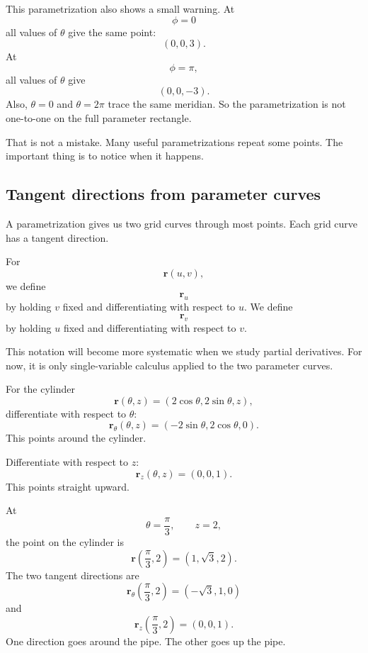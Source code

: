 This parametrization also shows a small warning.  At
\[
    \phi=0
\]
all values of \(\theta\) give the same point:
\[
    (0,0,3).
\]
At
\[
    \phi=\pi,
\]
all values of \(\theta\) give
\[
    (0,0,-3).
\]
Also, \(\theta=0\) and \(\theta=2\pi\) trace the same meridian.  So the parametrization
is not one-to-one on the full parameter rectangle.

That is not a mistake.  Many useful parametrizations repeat some points.  The important
thing is to notice when it happens.

\subsection{Tangent directions from parameter curves}

A parametrization gives us two grid curves through most points.  Each grid curve has
a tangent direction.

For
\[
    \mathbf r(u,v),
\]
we define
\[
    \mathbf r_u
\]
by holding \(v\) fixed and differentiating with respect to \(u\).  We define
\[
    \mathbf r_v
\]
by holding \(u\) fixed and differentiating with respect to \(v\).

This notation will become more systematic when we study partial derivatives.  For now,
it is only single-variable calculus applied to the two parameter curves.

\begin{example}
For the cylinder
\[
    \mathbf r(\theta,z)=(2\cos\theta,2\sin\theta,z),
\]
differentiate with respect to \(\theta\):
\[
    \mathbf r_\theta(\theta,z)=(-2\sin\theta,2\cos\theta,0).
\]
This points around the cylinder.

Differentiate with respect to \(z\):
\[
    \mathbf r_z(\theta,z)=(0,0,1).
\]
This points straight upward.

At
\[
    \theta=\frac{\pi}{3},\qquad z=2,
\]
the point on the cylinder is
\[
    \mathbf r\left(\frac{\pi}{3},2\right)
    =
    (1,\sqrt3,2).
\]
The two tangent directions are
\[
    \mathbf r_\theta\left(\frac{\pi}{3},2\right)
    =
    (-\sqrt3,1,0)
\]
and
\[
    \mathbf r_z\left(\frac{\pi}{3},2\right)
    =
    (0,0,1).
\]
One direction goes around the pipe.  The other goes up the pipe.
\end{example}

